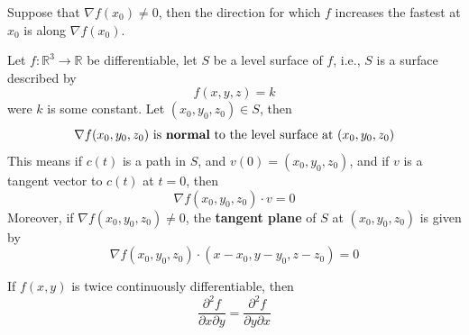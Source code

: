 \documentclass[openany]{book}
\newcommand{\R}{\mathbb{R}}
\begin{document}
\begin{prop}
    Suppose that $\nabla f(x_0)\neq 0$, then the direction for which $f$ increases the fastest at $x_0$ is along $\nabla f(x_0)$.
\end{prop}


\begin{prop}\label{tangent plane}
    Let $f:\R^3\to\R$ be differentiable, let $S$ be a level surface of $f$, i.e., $S$ is a surface described by 
    \begin{equation*}
        f(x,y,z)=k
    \end{equation*}
    were $k$ is some constant. Let $(x_0,y_0,z_0)\in S$, then
    \begin{equation*}
        \nabla f(x_0,y_0,z_0) \text{ is \textbf{normal} to the level surface at } (x_0,y_0,z_0)
    \end{equation*}
    This means if $c(t)$ is a path in $S$, and $v(0)=(x_0,y_0,z_0)$, and if $v$ is a tangent vector to $c(t)$ at $t=0$, then 
    \begin{equation*}
        \nabla f(x_0,y_0, z_0)\cdot v=0
    \end{equation*}
    Moreover, if $\nabla f(x_0,y_0,z_0)\neq 0$, the \textbf{tangent plane} of $S$ at $(x_0,y_0,z_0)$ is given by 
    \begin{equation*}
        \nabla f(x_0,y_0,z_0)\cdot (x-x_0, y-y_0, z-z_0)=0
    \end{equation*}
\end{prop}

\begin{prop}
    If $f(x,y)$ is twice continuously differentiable, then 
    \begin{equation*}
        \frac{\partial^2 f}{\partial x\partial y}=\frac{\partial^2f}{\partial y\partial x}
    \end{equation*}
\end{prop}




\end{document}
